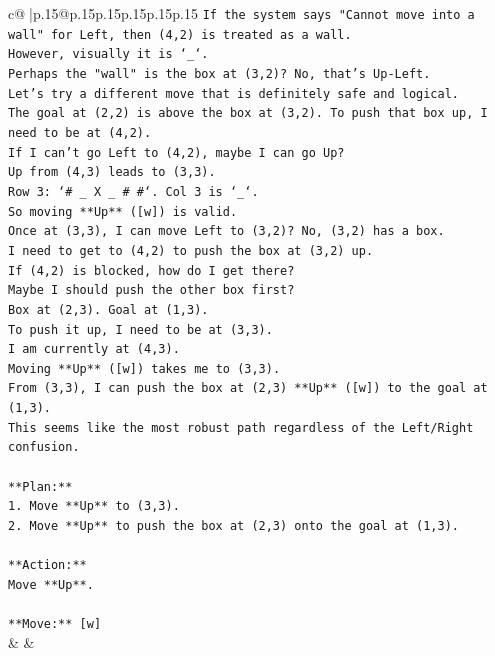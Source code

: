 \documentclass{article}
\begin{document}
{\begin{supertabular}{c@{$\;$}|p{.15\linewidth}@{}p{.15\linewidth}p{.15\linewidth}p{.15\linewidth}p{.15\linewidth}p{.15\linewidth}}
{{{\texttt{If the system says "Cannot move into a wall" for Left, then (4,2) is treated as a wall.} \\
\texttt{However, visually it is `\_`.} \\
\texttt{Perhaps the "wall" is the box at (3,2)? No, that's Up{-}Left.} \\
\texttt{Let's try a different move that is definitely safe and logical.} \\
\texttt{The goal at (2,2) is above the box at (3,2). To push that box up, I need to be at (4,2).} \\
\texttt{If I can't go Left to (4,2), maybe I can go Up?} \\
\texttt{Up from (4,3) leads to (3,3).} \\
\texttt{Row 3: `\# \_ X \_ \# \#`. Col 3 is `\_`.} \\
\texttt{So moving **Up** ({[}w{]}) is valid.} \\
\texttt{Once at (3,3), I can move Left to (3,2)? No, (3,2) has a box.} \\
\texttt{I need to get to (4,2) to push the box at (3,2) up.} \\
\texttt{If (4,2) is blocked, how do I get there?} \\
\texttt{Maybe I should push the other box first?} \\
\texttt{Box at (2,3). Goal at (1,3).} \\
\texttt{To push it up, I need to be at (3,3).} \\
\texttt{I am currently at (4,3).} \\
\texttt{Moving **Up** ({[}w{]}) takes me to (3,3).} \\
\texttt{From (3,3), I can push the box at (2,3) **Up** ({[}w{]}) to the goal at (1,3).} \\
\texttt{This seems like the most robust path regardless of the Left/Right confusion.} \\
\\ 
\texttt{**Plan:**} \\
\texttt{1. Move **Up** to (3,3).} \\
\texttt{2. Move **Up** to push the box at (2,3) onto the goal at (1,3).} \\
\\ 
\texttt{**Action:**} \\
\texttt{Move **Up**.} \\
\\ 
\texttt{**Move:** {[}w{]}} \\
            }
        }
    }
    & & \\ \\


\end{supertabular}}
\end{document}
